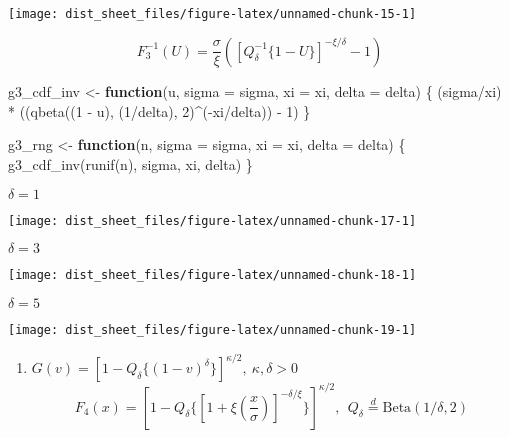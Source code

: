 \documentclass[
]{article}
\newenvironment{Shaded}{\begin{snugshade}}{\end{snugshade}}
\newcommand{\AttributeTok}[1]{\textcolor[rgb]{0.77,0.63,0.00}{#1}}
\newcommand{\ControlFlowTok}[1]{\textcolor[rgb]{0.13,0.29,0.53}{\textbf{#1}}}
\newcommand{\DecValTok}[1]{\textcolor[rgb]{0.00,0.00,0.81}{#1}}
\newcommand{\FunctionTok}[1]{\textcolor[rgb]{0.00,0.00,0.00}{#1}}
\newcommand{\NormalTok}[1]{#1}
\newcommand{\OtherTok}[1]{\textcolor[rgb]{0.56,0.35,0.01}{#1}}
\newcommand{\SpecialCharTok}[1]{\textcolor[rgb]{0.00,0.00,0.00}{#1}}
\providecommand{\tightlist}{%
  \setlength{\itemsep}{0pt}\setlength{\parskip}{0pt}}
\begin{document}
\begin{center}\texttt{[image: dist\_sheet\_files/figure-latex/unnamed-chunk-15-1]} \end{center}

\[F_3^{-1}(U) = \frac{\sigma}{\xi}\left([Q_\delta^{-1}\{1 - U\}]^{-\xi/\delta} - 1\right)\]

\begin{Shaded}
\begin{Highlighting}[]
\NormalTok{g3\_cdf\_inv }\OtherTok{\textless{}{-}} \ControlFlowTok{function}\NormalTok{(u, }\AttributeTok{sigma =}\NormalTok{ sigma, }\AttributeTok{xi =}\NormalTok{ xi, }\AttributeTok{delta =}\NormalTok{ delta) \{}
\NormalTok{    (sigma}\SpecialCharTok{/}\NormalTok{xi) }\SpecialCharTok{*}\NormalTok{ ((}\FunctionTok{qbeta}\NormalTok{((}\DecValTok{1} \SpecialCharTok{{-}}\NormalTok{ u), (}\DecValTok{1}\SpecialCharTok{/}\NormalTok{delta), }\DecValTok{2}\NormalTok{)}\SpecialCharTok{\^{}}\NormalTok{(}\SpecialCharTok{{-}}\NormalTok{xi}\SpecialCharTok{/}\NormalTok{delta)) }\SpecialCharTok{{-}}
        \DecValTok{1}\NormalTok{)}
\NormalTok{\}}

\NormalTok{g3\_rng }\OtherTok{\textless{}{-}} \ControlFlowTok{function}\NormalTok{(n, }\AttributeTok{sigma =}\NormalTok{ sigma, }\AttributeTok{xi =}\NormalTok{ xi, }\AttributeTok{delta =}\NormalTok{ delta) \{}
    \FunctionTok{g3\_cdf\_inv}\NormalTok{(}\FunctionTok{runif}\NormalTok{(n), sigma, xi, delta)}
\NormalTok{\}}
\end{Highlighting}
\end{Shaded}

\pagebreak

\(\delta = 1\)

\begin{center}\texttt{[image: dist\_sheet\_files/figure-latex/unnamed-chunk-17-1]} \end{center}

\(\delta = 3\)

\begin{center}\texttt{[image: dist\_sheet\_files/figure-latex/unnamed-chunk-18-1]} \end{center}

\(\delta = 5\)

\begin{center}\texttt{[image: dist\_sheet\_files/figure-latex/unnamed-chunk-19-1]} \end{center}

\begin{enumerate}
\def\labelenumi{\arabic{enumi}.}
\setcounter{enumi}{3}
\tightlist
\item
  \(G(v) = [1-Q_\delta\{(1-v)^\delta\}]^{\kappa/2}, \ \kappa, \delta > 0\)
  \[F_4(x) = [1 - Q_\delta\{[1 + \xi(\frac{x}{\sigma})]^{-\delta/\xi} \}]^{\kappa/2}, \ \ Q_\delta \stackrel{d}{=}\text{Beta}(1/\delta, 2)\]
\end{enumerate}
\end{document}
